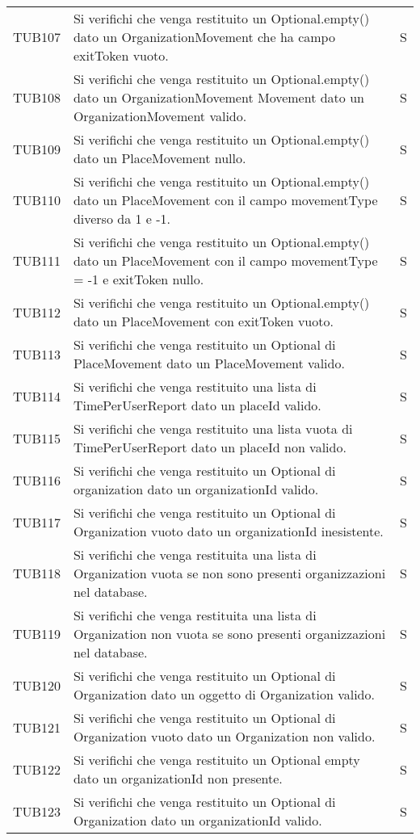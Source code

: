 {\begin{longtable}{ c C{13cm} C{1cm}}
TUB107 & Si verifichi che venga restituito un Optional.empty() dato un OrganizationMovement che ha campo exitToken vuoto. & S \\
TUB108 & Si verifichi che venga restituito un Optional.empty() dato un OrganizationMovement Movement  dato un OrganizationMovement valido. & S \\
TUB109 & Si verifichi che venga restituito un Optional.empty() dato un PlaceMovement nullo. & S \\
TUB110 & Si verifichi che venga restituito un Optional.empty() dato un PlaceMovement con il campo movementType diverso da 1 e -1. & S \\
TUB111 & Si verifichi che venga restituito un Optional.empty() dato un PlaceMovement con il campo movementType = -1 e exitToken nullo. & S \\
TUB112 & Si verifichi che venga restituito un Optional.empty() dato un PlaceMovement con exitToken vuoto. & S \\
TUB113 & Si verifichi che venga restituito un Optional di PlaceMovement dato un PlaceMovement valido. & S \\
TUB114 & Si verifichi che venga restituito una lista di TimePerUserReport dato un placeId valido. & S \\
TUB115 & Si verifichi che venga restituito una lista vuota di TimePerUserReport dato un placeId non valido. & S \\
TUB116 & Si verifichi che venga restituito un Optional di organization dato un organizationId valido. & S \\
TUB117 & Si verifichi che venga restituito un Optional di Organization vuoto dato un organizationId inesistente. & S \\
TUB118 & Si verifichi che venga restituita una lista di Organization vuota se non sono presenti organizzazioni nel database. & S \\
TUB119 & Si verifichi che venga restituita una lista di Organization non vuota se sono presenti organizzazioni nel database. & S \\
TUB120 & Si verifichi che venga restituito un Optional di Organization dato un oggetto di Organization valido. & S \\
TUB121 & Si verifichi che venga restituito un Optional di Organization vuoto dato un Organization non valido. & S \\
TUB122 & Si verifichi che venga restituito un Optional empty dato un organizationId non presente. & S \\
TUB123 & Si verifichi che venga restituito un Optional di Organization dato un organizationId valido. & S \\

\end{longtable}}
